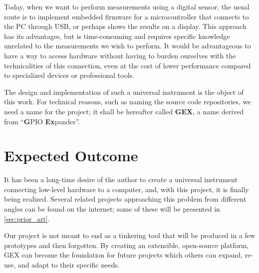 Today, when we want to perform measurements using a digital sensor, the usual route is to implement embedded firmware for a microcontroller that connects to the \gls{PC} through \gls{USB}, or perhaps shows the results on a display. This approach has its advantages, but is time-consuming and requires specific knowledge unrelated to the measurements we wish to perform. It would be advantageous to have a way to access hardware without having to burden ourselves with the technicalities of this connection, even at the cost of lower performance compared to specialized devices or professional tools.

The design and implementation of such a universal instrument is the object of this work. For technical reasons, such as naming the source code repositories, we need a name for the project; it shall be hereafter called \textbf{GEX}, a name derived from ``\textbf{G}PIO \textbf{Ex}pander''.

\section{Expected Outcome}\label{sec:expected_outcome}

It has been a long-time desire of the author to create a universal instrument connecting low-level hardware to a computer, and, with this project, it is finally being realized. Several related projects approaching this problem from different angles can be found on the internet; some of these will be presented in \cref{sec:prior_art}. 

Our project is not meant to end as a tinkering tool that will be produced in a few prototypes and then forgotten. By creating an extensible, open-source platform, GEX can become the foundation for future projects which others can expand, re-use, and adapt to their specific needs.

